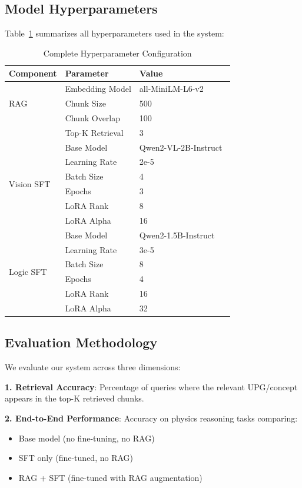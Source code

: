 \documentclass[11pt,a4paper]{article}
\begin{document}
\subsection{Model Hyperparameters}

Table~\ref{tab:hyperparameters} summarizes all hyperparameters used in the system:

\begin{table}[H]
\centering
\begin{tabular}{lll}
\toprule
\textbf{Component} & \textbf{Parameter} & \textbf{Value} \\
\midrule
\multirow{3}{*}{RAG} & Embedding Model & all-MiniLM-L6-v2 \\
& Chunk Size & 500 \\
& Chunk Overlap & 100 \\
& Top-K Retrieval & 3 \\
\midrule
\multirow{6}{*}{Vision SFT} & Base Model & Qwen2-VL-2B-Instruct~\cite{bai2023qwen} \\
& Learning Rate & 2e-5 \\
& Batch Size & 4 \\
& Epochs & 3 \\
& LoRA Rank~\cite{hu2021lora} & 8 \\
& LoRA Alpha & 16 \\
\midrule
\multirow{6}{*}{Logic SFT} & Base Model & Qwen2-1.5B-Instruct~\cite{bai2023qwen} \\
& Learning Rate & 3e-5 \\
& Batch Size & 8 \\
& Epochs & 4 \\
& LoRA Rank & 16 \\
& LoRA Alpha & 32 \\
\bottomrule
\end{tabular}
\caption{Complete Hyperparameter Configuration}
\label{tab:hyperparameters}
\end{table}

\subsection{Evaluation Methodology}

We evaluate our system across three dimensions:

\textbf{1. Retrieval Accuracy}: Percentage of queries where the relevant UPG/concept appears in the top-K retrieved chunks.

\textbf{2. End-to-End Performance}: Accuracy on physics reasoning tasks comparing:
\begin{itemize}
    \item Base model (no fine-tuning, no RAG)
    \item SFT only (fine-tuned, no RAG)
    \item RAG + SFT (fine-tuned with RAG augmentation)
\end{itemize}
\end{document}
